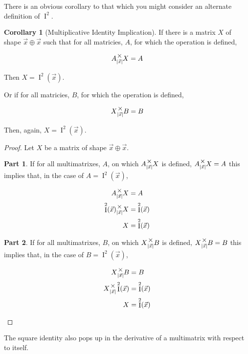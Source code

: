 \documentclass[12pt]{book}
\theoremstyle{plain}
\theoremstyle{definition}
\newtheorem{corollary}{Corollary}[theorem]
\theoremstyle{ppart}
\newtheorem{ppart}{Part}
\theoremstyle{case}
\theoremstyle{solution}
\DeclareMathOperator{\Ident}{I}
\newcommand{\mmult}[1]{\text{\raisebox{1ex}{$\underset{#1}{\times}$}}}
\begin{document}
There is an obvious corollary to that which you might consider an
alternate definition of $\Ident^2$.

\begin{corollary}[Multiplicative Identity Implication]
\label{mm_ident_imp}
If there is a matrix $X$ of shape $\vec{x} \oplus \vec{x}$ such that
for all matricies, $A$, for which the operation is defined,

\[A \mmult{|\vec{x}|} X = A \]

Then $X = \Ident^2(\vec{x})$.

Or if for all matricies, $B$, for which the operation is defined,

\[X \mmult{|\vec{x}|} B = B \]

Then, again, $X = \Ident^2(\vec{x})$.
\end{corollary}
\begin{proof}
Let $X$ be a matrix of shape $\vec{x} \oplus \vec{x}$. 
\begin{ppart}
If for all multimatrixes, $A$, on which $A \mmult{|\vec{x}|} X$ is defined, 
$A \mmult{|\vec{x}|} X = A$ this implies that, in the case of $A = \Ident^2(\vec{x})$,

\begin{align*}
  A \mmult{|\vec{x}|} X &= A \\
 \Ident^2(\vec{x}) \mmult{|\vec{x}|} X &= \Ident^2(\vec{x}) \\
  X &= \Ident^2(\vec{x}) 
\end{align*}
\end{ppart}
\begin{ppart}
If for all multimatrixes, $B$, on which $X \mmult{|\vec{x}|} B$ is defined, 
$X \mmult{|\vec{x}|} B = B$ this implies that, in the case of $B = \Ident^2(\vec{x})$,

\begin{align*}
  X \mmult{|\vec{x}|} B &= B \\
  X \mmult{|\vec{x}|} \Ident^2(\vec{x}) &= \Ident^2(\vec{x}) \\
  X &= \Ident^2(\vec{x}) 
\end{align*}
\end{ppart}
\end{proof}

The square identity also pops up in the derivative of a multimatrix
with respect to itself.
\end{document}
